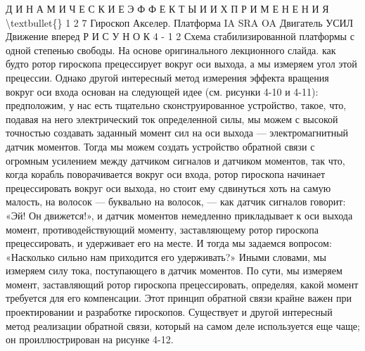 \documentclass[10pt,oneside]{article}
\begin{document}
Д И Н А М И Ч Е С К И Е  Э Ф Ф Е К Т Ы  И  И Х  П Р И М Е Н Е Н И Я \textbackslash{}textbullet\{\} 1 2 7 Гироскоп Акселер. Платформа IA SRA OA Двигатель УСИЛ Движение вперед Р И С У Н О К  4 - 1 2 Схема стабилизированной платформы с одной степенью свободы. На основе оригинального лекционного слайда. как будто ротор гироскопа прецессирует вокруг оси выхода, а мы измеряем угол этой прецессии. Однако другой интересный метод измерения эффекта вращения вокруг оси входа основан на следующей идее (см. рисунки 4-10 и 4-11): предположим, у нас есть тщательно сконструированное устройство, такое, что, подавая на него электрический ток определенной силы, мы можем с высокой точностью создавать заданный момент сил на оси выхода --- электромагнитный датчик моментов. Тогда мы можем создать устройство обратной связи с огромным усилением между датчиком сигналов и датчиком моментов, так что, когда корабль поворачивается вокруг оси входа, ротор гироскопа начинает прецессировать вокруг оси выхода, но стоит ему сдвинуться хоть на самую малость, на волосок --- буквально на волосок, --- как датчик сигналов говорит: «Эй! Он движется!», и датчик моментов немедленно прикладывает к оси выхода момент, противодействующий моменту, заставляющему ротор гироскопа прецессировать, и удерживает его на месте. И тогда мы задаемся вопросом: «Насколько сильно нам приходится его удерживать?» Иными словами, мы измеряем силу тока, поступающего в датчик моментов. По сути, мы измеряем момент, заставляющий ротор гироскопа прецессировать, определяя, какой момент требуется для его компенсации. Этот принцип обратной связи крайне важен при проектировании и разработке гироскопов. Существует и другой интересный метод реализации обратной связи, который на самом деле используется еще чаще; он проиллюстрирован на рисунке 4-12.\par
\end{document}
